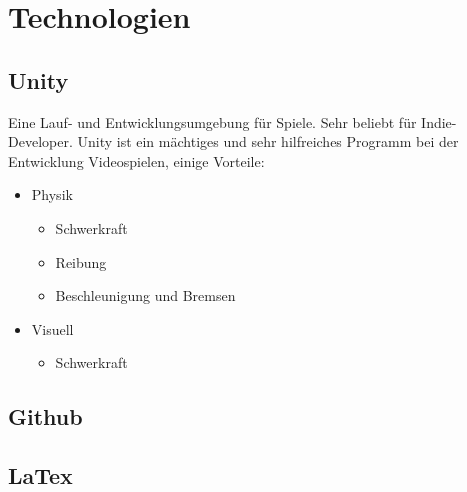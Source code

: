 \chapter{Technologien}

\section{Unity}
Eine Lauf- und Entwicklungsumgebung für Spiele.
Sehr beliebt für Indie-Developer.
Unity ist ein mächtiges und sehr hilfreiches Programm bei der Entwicklung Videospielen, einige Vorteile:
\begin{itemize}
    \item Physik
    \begin{itemize}
        \item Schwerkraft
        \item Reibung
        \item Beschleunigung und Bremsen
    \end{itemize}
    \item Visuell
    \begin{itemize}
        \item Schwerkraft
    \end{itemize}
\end{itemize}

\section{Github}


\section{LaTex}

